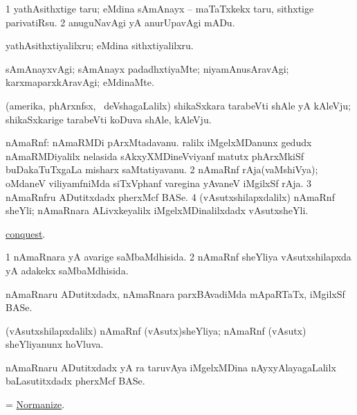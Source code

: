 \bentry
{}
\gl{\sakirx}
\bmng
\bnum
\num{1} yathAsithxtige taru; eMdina sAmAnayx -- maTaTxkekx taru, sithxtige parivatiRsu. 
\num{2} anuguNavAgi yA anurUpavAgi mADu. 
\enum
\emng

\noindent
\gl{\akirx}
\bmng
yathAsithxtiyalilxru; eMdina sithxtiyalilxru. 
\emng
\eentry

\bentry
{}
\gl{\kirxvi}
\bmng
sAmAnayxvAgi; sAmAnayx padadhxtiyaMte; niyamAnusAravAgi; karxmaparxkAravAgi; eMdinaMte. 
\emng
\eentry

\bentry
{}
\gl{\nA}
\bmng
(amerika, phArxnfsx, \mo\ deVshagaLalilx) shikaSxkara tarabeVti shAle yA kAleVju; shikaSxkarige tarabeVti koDuva shAle, kAleVju. 
\emng
\eentry

\bentry
{}
\gl{\nA}
\bmng
\bnum
{} nAmaRnf: 
\banum
{} nAmaRMDi pArxMtadavanu. 
 ralilx iMgelxMDanunx gedudx nAmaRMDiyalilx nelasida sAkxyXMDineVviyanf matutx phArxMkiSf buDakaTuTxgaLa misharx saMtatiyavanu. 
\eanum
\numie
\num{2} nAmaRnf rAja(vaMshiVya); oMdaneV viliyamfniMda siTxVphanf varegina yAvaneV iMgilxSf rAja. 
\num{3} nAmaRnfru ADutitxdadx pherxMcf BASe. 
\num{4} (vAsutxshilapxdalilx) nAmaRnf sheYli; nAmaRnara ALivxkeyalilx iMgelxMDinalilxdadx vAsutxsheYli. 
\enum
\emng

\noindent
\gl{\pagu}
\bmng
{} \hyperref{kandict_c.pdf}{C}{conquest pagu}{conquest}. 
\emng
\eentry

\bentry
{}
\gl{\gu}
\bmng
\bnum
\num{1} nAmaRnara yA avarige saMbaMdhisida. 
\num{2} nAmaRnf sheYliya vAsutxshilapxda yA adakekx saMbaMdhisida. 
\enum
\emng
\eentry

\bentry
{}
\gl{\nA}
\bmng
nAmaRnaru ADutitxdadx, nAmaRnara parxBAvadiMda mApaRTaTx, iMgilxSf BASe. 
\emng
\eentry

\bentry
{}
\gl{\gu}
\bmng
(vAsutxshilapxdalilx) nAmaRnf (vAsutx)sheYliya; nAmaRnf (vAsutx) sheYliyanunx hoVluva. 
\emng
\eentry

\bentry
{}
\gl{\nA}
\bmng
nAmaRnaru ADutitxdadx yA ra taruvAya iMgelxMDina nAyxyAlayagaLalilx baLasutitxdadx pherxMcf BASe. 
\emng
\eentry

\bentry
{}
\gl{\kirx}
\bmng
= \hyperlink{Normanize}{Normanize}. 
\emng
\eentry

